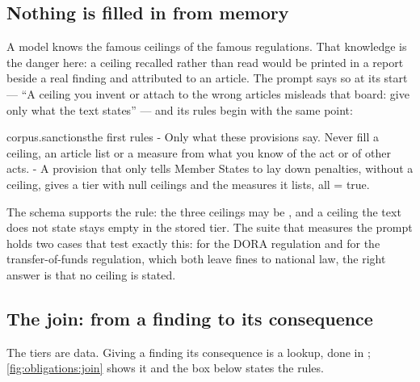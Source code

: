 \subsection{Nothing is filled in from memory}

A model knows the famous ceilings of the famous regulations. That knowledge is the danger
here: a ceiling recalled rather than read would be printed in a report beside a real finding
and attributed to an article. The prompt says so at its start --- \enquote{A ceiling you
invent or attach to the wrong articles misleads that board: give only what the text states}
--- and its rules begin with the same point:

\begin{promptexcerpt}{corpus.sanctions}{the first rules}
- Only what these provisions say. Never fill a ceiling, an article list or a measure from what you know of the act or of other acts.
- A provision that only tells Member States to lay down penalties, without a ceiling, gives a tier with null ceilings and the measures it lists, all = true.
\end{promptexcerpt}

The schema supports the rule: the three ceilings may be , and a ceiling the text
does not state stays empty in the stored tier. The suite that measures the prompt holds two
cases that test exactly this: for the DORA regulation and for the transfer-of-funds
regulation, which both leave fines to national law, the right answer is that no ceiling is
stated.

\subsection{The join: from a finding to its consequence}

The tiers are data. Giving a finding its consequence is a lookup, done in
; \cref{fig:obligations:join} shows it and the box below states the
rules.

